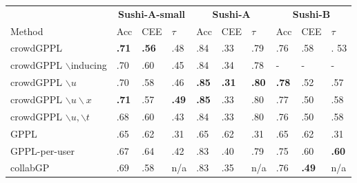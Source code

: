 \begin{table}
 \centering
 \small
 \setlength{\tabcolsep}{4pt}
 \begin{tabular}{l l l l@{\hskip 0.5cm} l l l@{\hskip 0.5cm} l l l}
\toprule
& \multicolumn{3}{c}{\textbf{Sushi-A-small}} & \multicolumn{3}{c}{\textbf{Sushi-A}} & \multicolumn{3}{c}{\textbf{Sushi-B}} \\ 
Method & Acc & CEE & $\tau$ & Acc & CEE & $\tau$ & Acc & CEE & $\tau$ \\
\midrule
crowdGPPL & \textbf{.71} & \textbf{.56} & .48 %
& .84 & .33 & .79 %
& .76 & .58 & . 53 %
 \\
crowdGPPL $\backslash $inducing & .70 & .60 & .45 %
& .84 & .34 & .78 %
& - & - & - 
\\
crowdGPPL $\backslash u$ & .70 & .58 & .46 &  %
\textbf{.85} & \textbf{.31} & \textbf{.80} %
& \textbf{.78} & .52 & .57 %
\\
crowdGPPL $\backslash u \backslash x$ & \textbf{.71} & .57 & \textbf{.49} & %
\textbf{.85} & .33 & .80 %
& .77 & .50 & .58 %
\\
crowdGPPL $\backslash u,\backslash t$ %
& .68 & .60 & .43 %
& .84 & .33 & .80 %
& .76 & .50 & .58 %
\\ 
\midrule 
GPPL & .65 & .62 & .31 %
& .65 & .62 & .31 %
& .65 & .62 & .31 %
\\
GPPL-per-user & .67 & .64 & .42 %
& .83 & .40 & .79 %
& .75 & .60 & \textbf{.60} %
\\
collabGP & .69 & .58 & n/a %
& .83 & .35 & n/a %
& .76 & \textbf{.49} & n/a %

\end{tabular}
\end{table}
